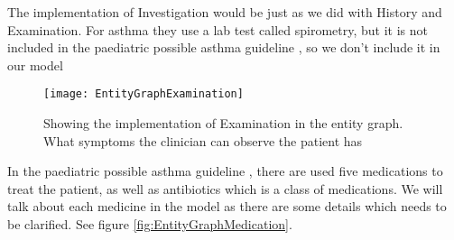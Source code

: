 The implementation of Investigation would be just as we did with History and Examination. For asthma they use a lab test called spirometry, but it is not included in the paediatric possible asthma guideline \parencite{RepublicofKeny2016}, so we don't include it in our model

\begin{figure}[h!]
	\texttt{[image: EntityGraphExamination]}
	\caption {Showing the implementation of Examination in the entity graph. What symptoms the clinician can observe the patient has}
	\label{fig:EntityGraphExamination}
\end{figure}

In the paediatric possible asthma guideline \parencite{RepublicofKeny2016}, there are used five medications to treat the patient, as well as antibiotics which is a class of medications. We will talk about each medicine in the model as there are some details which needs to be clarified. See figure \ref{fig:EntityGraphMedication}.


